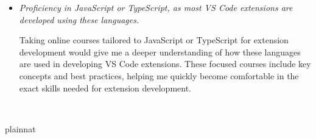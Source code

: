 \documentclass[12pt]{article}
\begin{document}
\begin{itemize}[label={}, wide=0pt, leftmargin=*]
  \item \textit{Proficiency in JavaScript or TypeScript, as most VS
    Code extensions are developed using these languages.}

    Taking online courses tailored to JavaScript or TypeScript for
    extension development would give me a deeper understanding of how
    these languages are used in developing VS Code extensions. These
    focused courses include key concepts and best practices, helping
    me quickly become comfortable  in the exact skills needed for
    extension development.

\end{itemize}

~\newpage

 {plainnat}

\end{document}
